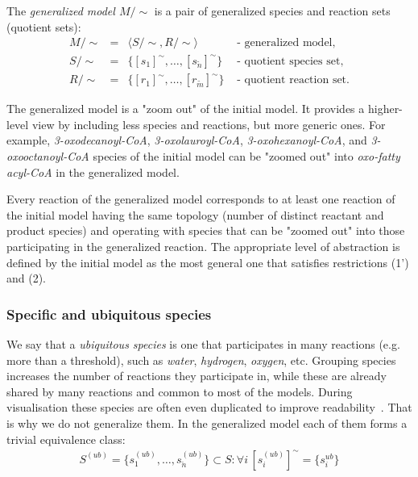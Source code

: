 \documentclass[9pt]{article}
\newcounter{def}
\newcounter{rm}
\begin{document}
The \emph{generalized model $M/\sim$} is a pair of generalized species and reaction sets (quotient sets):
\[ \begin{array}{ccll}
\mbox{$M/\sim$} & \mbox{$=$} & \mbox{$\langle S/\sim, R/\sim \rangle$} & \mbox{ - generalized model,} \\
\mbox{$S/\sim$} & \mbox{$=$} & \mbox{$\{[s_1]^{\sim}, \ldots, [s_{\tilde{n}}]^{\sim}\}$} &  \mbox{ - quotient species set,} \\
\mbox{$R/\sim$} & \mbox{$=$} & \mbox{$\{[r_1]^{\sim}, \ldots, [r_{\tilde{m}}]^{\sim}\}$} &  \mbox{ - quotient reaction set.} 
\end{array} \]

The generalized model is a "zoom out" of the initial model. It provides a higher-level view by including less species and reactions, but more generic ones. For example, \textit{3-oxodecanoyl-CoA}, \textit{3-oxolauroyl-CoA}, \textit{3-oxohexanoyl-CoA}, and \textit{3-oxooctanoyl-CoA} species of the initial model can be "zoomed out" into \textit{oxo-fatty acyl-CoA} in the generalized model. 

Every reaction of the generalized model corresponds to at least one reaction of the initial model having the same topology (number of distinct reactant and product species) and operating with species that can be "zoomed out" into those participating in the generalized reaction. The appropriate level of abstraction is defined by the initial model as the most general one that satisfies restrictions (1') and (2).


\subsubsection*{Specific and ubiquitous species}
We say that a \emph{ubiquitous species} is one that participates in many reactions (e.g. more than a threshold), such as \emph{water}, \emph{hydrogen}, \emph{oxygen}, etc. Grouping species increases the number of reactions they participate in, while these are already shared by many reactions and common to most of the models. During visualisation these species are often even duplicated to improve readability~\citep{Rohn2012}. That is why we do not generalize them. In the generalized model each of them forms a trivial equivalence class:
\[ \begin{array}{l}
\mbox{$S^{(ub)} = \{s^{(ub)}_1, \ldots, s^{(ub)}_{\breve{n}}\} \subset S: \forall i\,[s^{(ub)}_i]^{\sim} = \{s^{ub}_i\}$} 
\end{array} \]
\end{document}
